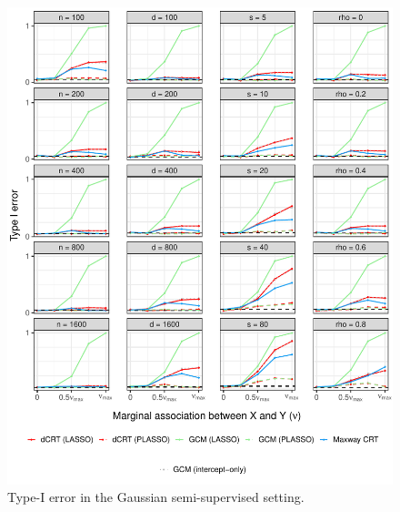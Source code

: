\documentclass[aos]{imsart}
\theoremstyle{plain}
\theoremstyle{remark}
\begin{document}
\begin{figure}[!ht]
	\centering
	\includegraphics[width = \textwidth]{figures/gaussian_semi_supervised_setting_null.pdf}
	\caption{Type-I error in the Gaussian semi-supervised setting.}
	\label{fig:gaussian_semi-supervised_null}
\end{figure}
\end{document}
